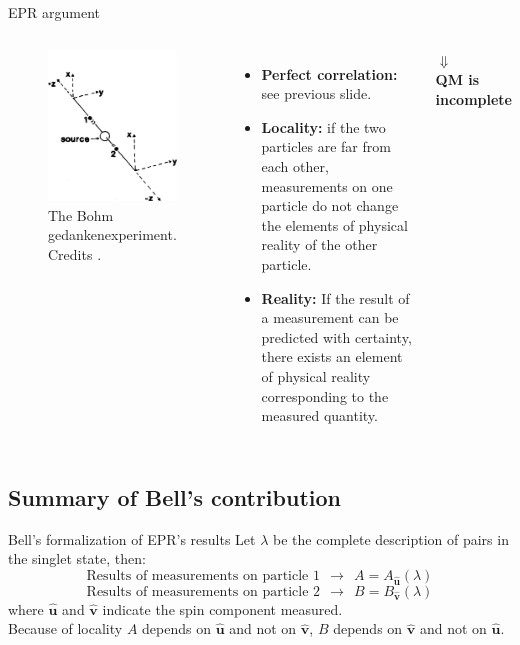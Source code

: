 \documentclass[10pt]{beamer}
\begin{document}
\begin{frame}{EPR argument}
  \begin{columns}[c] %
    \begin{figure}
      \includegraphics[width=3.5cm]{Images/eprb-gedankenexperiment.png}
      \caption{The Bohm gedankenexperiment. Credits \cite{:/content/aapt/journal/ajp/58/12/10.1119/1.16243}.}
      \label{fig:eprb-gedankenexperiment}
    \end{figure}
    \begin{itemize}
    \item \textbf{Perfect correlation:} see previous slide.
    \item \textbf{Locality:} if the two particles are far from each other, measurements on one particle do not change the elements of physical reality of the other particle.
    \item \textbf{Reality:} If the result of a measurement can be predicted with certainty, there exists an element of physical reality corresponding to the measured quantity.
    \end{itemize}
    \begin{center}
      {\Large $\Downarrow$}\\[0.1cm]
      \textbf{QM is incomplete}
    \end{center}
  \end{columns}
\end{frame}




\subsection{Summary of Bell's contribution}
\begin{frame}{Bell's formalization of EPR's results}
  Let $\lambda$ be the complete description of pairs in the singlet state, then:
  \begin{equation*}
    \text{Results of measurements on particle 1} ~~ \longrightarrow ~~ A = A_{\mathbf{\hat{u}}}(\lambda)
  \end{equation*}
  \begin{equation*}
    \text{Results of measurements on particle 2} ~~ \longrightarrow ~~ B = B_{\mathbf{\hat{v}}}(\lambda)
  \end{equation*}
where ${\mathbf{\hat{u}}}$ and ${\mathbf{\hat{v}}}$ indicate the spin component measured.\\[1cm]
Because of locality $A$ depends on ${\mathbf{\hat{u}}}$ and not on ${\mathbf{\hat{v}}}$, $B$ depends on ${\mathbf{\hat{v}}}$ and not on ${\mathbf{\hat{u}}}$.
\end{frame}
\end{document}
